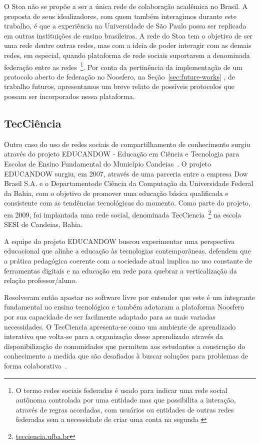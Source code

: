 O Stoa não se propõe a ser a única rede de colaboração acadêmica no Brasil. A
proposta de seus idealizadores, com quem também interagimos durante este trabalho,
é que a experiência na Universidade de São Paulo possa ser replicada em
outras instituições de ensino brasileiras.
%
A rede do Stoa tem o objetivo de ser uma rede dentre outras redes, mas com a ideia de poder
interagir com as demais redes, em especial, quando plataforma de rede sociais suportarem
a denominada federação entre as redes~\footnote{O termo redes sociais federadas é usado 
para indicar uma rede social autônoma controlada por uma entidade mas que possibilita a
interação, através de regras acordadas, com usuários ou entidades de outras redes
federadas sem a necessidade de criar uma conta na segunda \cite{prodomou2010}}.
%
Por conta da pertinência da implementação de um protocolo aberto de federação no Noosfero,
na Seção~\ref{sec:future-works} , de trabalho futuros, apresentamos um breve relato de possíveis
protocolos que possam ser incorporados nessa plataforma.

\subsection{TecCiência}
\label{subsec:tecciencia}

Outro caso do uso de redes sociais de compartilhamento de conhecimento surgiu através do
projeto EDUCANDOW  - Educação em Ciência e Tecnologia para
Escolas de Ensino Fundamental do Município Candeias~\cite{santos2012}.
%
O projeto EDUCANDOW surgiu, em 2007, através de uma parceria entre a empresa
Dow Brasil S.A. e o Departamentode Ciência da Computação da Universidade Federal da Bahia,
com o objetivo de promover uma educação básica qualificada e consistente com as tendências tecnológicas
do momento.
%
Como parte do projeto, em 2009, foi implantada uma rede social, denominada TecCiencia~\footnote{\url{tecciencia.ufba.br}}
na escola SESI de Candeias, Bahia.

A equipe do projeto EDUCANDOW buscou experimentar uma perspectiva educacional que
alinhe a educação às tecnologias contemporâneas.
%
 defendem que a prática pedagógica coerente com a sociedade atual
implica no uso constante de ferramentas digitais e na educação em rede para quebrar a
verticalização da relação professor/aluno.

Resolveram então apostar no software livre por entender que este é um integrante
fundamental no ensino tecnológico e também adotaram a plataforma Noosfero por sua
capacidade de ser facilmente adaptado para as mais variadas necessidades. O
TecCiencia apresenta-se como um ambiente de aprendizado interativo que volta-se
para a organização desse aprendizado através da disponibilização de comunidades
que permitem aos estudantes a construção do conhecimento a medida que são
desafiados à buscar soluções para problemas de forma colaborativa~\cite{santos2012}.

